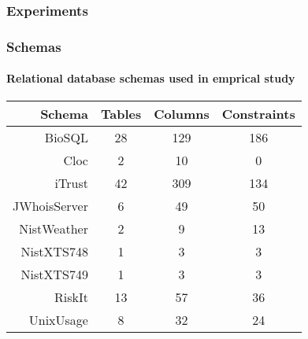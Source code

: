  \begin{frame}
        \frametitle{Experiments}
        \centering
        
        
\end{frame}

\begin{frame}
  \frametitle{Schemas}
  \framesubtitle{Relational database schemas used in emprical study}

  \begin{center}

  {\normalsize
  \begin{tabular}{r | c c c}
                           Schema & Tables & Columns & Constraints \\ \hline
    BioSQL                        & 28     & 129     & 186 \\
    Cloc                          & 2      & 10      & 0 \\
    iTrust                        & 42     & 309     & 134 \\
    JWhoisServer                  & 6      & 49      & 50 \\
    NistWeather                   & 2      & 9       & 13 \\
    NistXTS748                    & 1      & 3       & 3 \\
    NistXTS749                    & 1      & 3       & 3 \\
    RiskIt                        & 13     & 57      & 36 \\
    UnixUsage                     & 8      & 32      & 24
\end{tabular}}

\end{center}

\end{frame}
